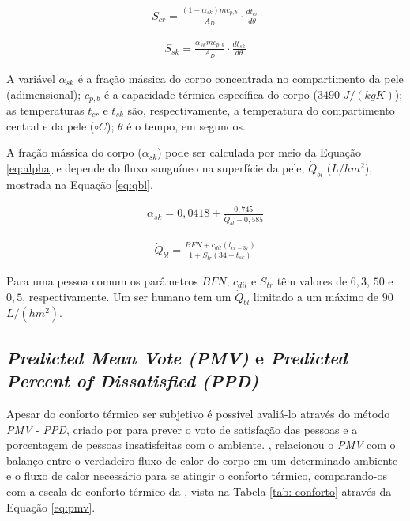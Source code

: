 \documentclass[acronym,symbols,table]{fei}
\begin{document}
\begin{equation} \label{eq:scr}
    \begin{aligned}
   S_{cr}= \frac{(1-\alpha_{sk})mc_{p,b}}{A_{D}}\cdot \frac{dt_{cr}}{d\theta}
    \end{aligned}
\end{equation}

\begin{equation} \label{eq:ssk}
    \begin{aligned}
   S_{sk}= \frac{\alpha_{sk}mc_{p,b}}{A_{D}}\cdot \frac{dt_{sk}}{d\theta} 
    \end{aligned}
\end{equation}

A variável $\alpha_{sk}$ é a fração mássica do corpo concentrada no compartimento da pele (adimensional); $c_{p,b}$ é a capacidade térmica específica do corpo ($3490$ $J/(kgK)$); as temperaturas $t_{cr}$ e $t_{sk}$ são, respectivamente, a temperatura do compartimento central e da pele ($\circ C$); $\theta$ é o tempo, em segundos.

A fração mássica do corpo ($\alpha_{sk}$) pode ser calculada por meio da Equação \ref{eq:alpha} e depende do fluxo sanguíneo na superfície da pele, $\dot{Q}_{bl}$ ($L/hm^2$), mostrada na Equação \ref{eq:qbl}.  

\begin{equation} \label{eq:alpha}
    \begin{aligned}
    \alpha_{sk}= 0,0418+ \frac{0,745}{\dot{Q}_{bl} - 0,585} 
    \end{aligned}
\end{equation}

\begin{equation} \label{eq:qbl}
    \begin{aligned}
   \dot{Q}_{bl}= \frac{BFN + c_{dil}(t_{cr-37})}{1 + S_{tr}(34-t_{sk})} 
    \end{aligned}
\end{equation}

Para uma pessoa comum os parâmetros $BFN$, $c_{dil}$ e $S_{tr}$ têm valores de $6,3$, $50$ e $0,5$, respectivamente. Um ser humano tem um $\dot{Q}_{bl}$ limitado a um máximo de $90$ $L/(hm^2)$. 

\subsection{\textit{Predicted Mean Vote (PMV)} e \textit{Predicted Percent of Dissatisfied (PPD)}}

Apesar do conforto térmico ser subjetivo é possível avaliá-lo através do método \textit{PMV} - \textit{PPD}, criado por \textcite{fanger1970thermal} para prever o voto de satisfação das pessoas e a porcentagem de pessoas insatisfeitas com o ambiente. \textcite{fanger1970thermal}, relacionou o \textit{PMV} com o balanço entre o verdadeiro fluxo de calor do corpo em um determinado ambiente e o fluxo de calor necessário para se atingir o conforto térmico, comparando-os com a escala de conforto térmico da \textcite{ASHRAE2009}, vista na Tabela \ref{tab: conforto} através da Equação \ref{eq:pmv}.
\end{document}
